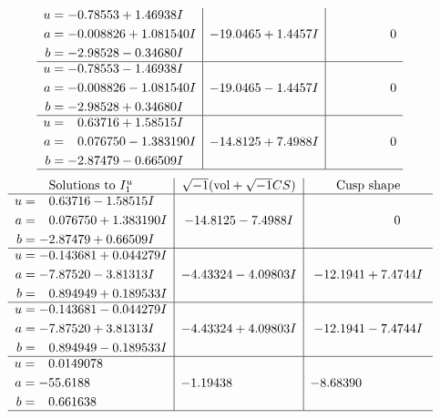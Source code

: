 \documentclass[1p]{elsarticle_modified}
\theoremstyle{definition}
\newcommand{\I}{\sqrt{-1}}
\begin{document}
$$\begin{array}{c|c|c}
\begin{aligned}
u &= -0.78553 + 1.46938 I \\
a &= -0.008826 + 1.081540 I \\
b &= -2.98528 - 0.34680 I\end{aligned}
 & -19.0465 + 1.4457 I & \phantom{-0.000000 } 0 \\ \hline\begin{aligned}
u &= -0.78553 - 1.46938 I \\
a &= -0.008826 - 1.081540 I \\
b &= -2.98528 + 0.34680 I\end{aligned}
 & -19.0465 - 1.4457 I & \phantom{-0.000000 } 0 \\ \hline\begin{aligned}
u &= \phantom{-}0.63716 + 1.58515 I \\
a &= \phantom{-}0.076750 - 1.383190 I \\
b &= -2.87479 - 0.66509 I\end{aligned}
 & -14.8125 + 7.4988 I & \phantom{-0.000000 } 0\\
 \hline 
 \end{array}$$\newpage$$\begin{array}{c|c|c}  
\text{Solutions to }I^u_{1}& \I (\text{vol} + \sqrt{-1}CS) & \text{Cusp shape}\\
 \hline 
\begin{aligned}
u &= \phantom{-}0.63716 - 1.58515 I \\
a &= \phantom{-}0.076750 + 1.383190 I \\
b &= -2.87479 + 0.66509 I\end{aligned}
 & -14.8125 - 7.4988 I & \phantom{-0.000000 } 0 \\ \hline\begin{aligned}
u &= -0.143681 + 0.044279 I \\
a &= -7.87520 - 3.81313 I \\
b &= \phantom{-}0.894949 + 0.189533 I\end{aligned}
 & -4.43324 - 4.09803 I & -12.1941 + 7.4744 I \\ \hline\begin{aligned}
u &= -0.143681 - 0.044279 I \\
a &= -7.87520 + 3.81313 I \\
b &= \phantom{-}0.894949 - 0.189533 I\end{aligned}
 & -4.43324 + 4.09803 I & -12.1941 - 7.4744 I \\ \hline\begin{aligned}
u &= \phantom{-}0.0149078\phantom{ +0.000000I} \\
a &= -55.6188\phantom{ +0.000000I} \\
b &= \phantom{-}0.661638\phantom{ +0.000000I}\end{aligned}
 & -1.19438\phantom{ +0.000000I} & -8.68390\phantom{ +0.000000I}\\
 \hline 
 \end{array}$$\newpage\newpage\renewcommand{\arraystretch}{1}
\end{document}
